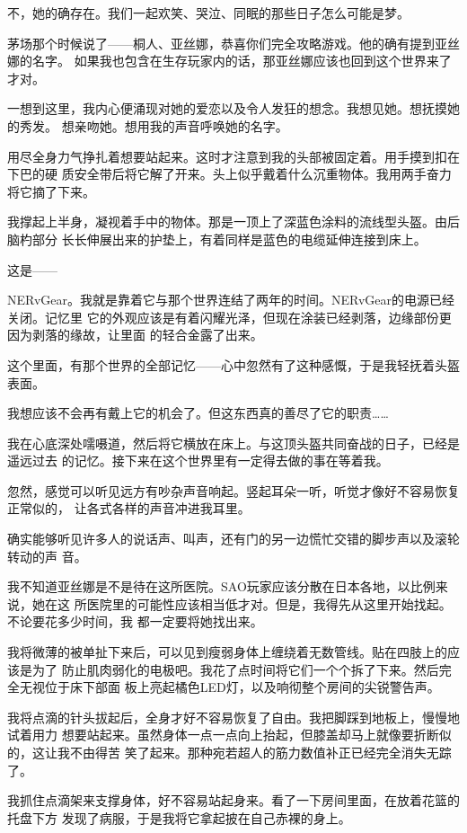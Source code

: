 \documentclass[11pt]{book}
\begin{document}
不，她的确存在。我们一起欢笑、哭泣、同眠的那些日子怎么可能是梦。

茅场那个时候说了——桐人、亚丝娜，恭喜你们完全攻略游戏。他的确有提到亚丝娜的名字。
如果我也包含在生存玩家内的话，那亚丝娜应该也回到这个世界来了才对。

一想到这里，我内心便涌现对她的爱恋以及令人发狂的想念。我想见她。想抚摸她的秀发。
想亲吻她。想用我的声音呼唤她的名字。

用尽全身力气挣扎着想要站起来。这时才注意到我的头部被固定着。用手摸到扣在下巴的硬
质安全带后将它解了开来。头上似乎戴着什么沉重物体。我用两手奋力将它摘了下来。

我撑起上半身，凝视着手中的物体。那是一顶上了深蓝色涂料的流线型头盔。由后脑杓部分
长长伸展出来的护垫上，有着同样是蓝色的电缆延伸连接到床上。

这是——

NERvGear。我就是靠着它与那个世界连结了两年的时间。NERvGear的电源已经关闭。记忆里
它的外观应该是有着闪耀光泽，但现在涂装已经剥落，边缘部份更因为剥落的缘故，让里面
的轻合金露了出来。

这个里面，有那个世界的全部记忆——心中忽然有了这种感慨，于是我轻抚着头盔表面。

我想应该不会再有戴上它的机会了。但这东西真的善尽了它的职责……

我在心底深处嚅嗫道，然后将它横放在床上。与这顶头盔共同奋战的日子，已经是遥远过去
的记忆。接下来在这个世界里有一定得去做的事在等着我。

忽然，感觉可以听见远方有吵杂声音响起。竖起耳朵一听，听觉才像好不容易恢复正常似的，
让各式各样的声音冲进我耳里。

确实能够听见许多人的说话声、叫声，还有门的另一边慌忙交错的脚步声以及滚轮转动的声
音。

我不知道亚丝娜是不是待在这所医院。SAO玩家应该分散在日本各地，以比例来说，她在这
所医院里的可能性应该相当低才对。但是，我得先从这里开始找起。不论要花多少时间，我
都一定要将她找出来。

我将微薄的被单扯下来后，可以见到瘦弱身体上缠绕着无数管线。贴在四肢上的应该是为了
防止肌肉弱化的电极吧。我花了点时间将它们一个个拆了下来。然后完全无视位于床下部面
板上亮起橘色LED灯，以及响彻整个房间的尖锐警告声。

我将点滴的针头拔起后，全身才好不容易恢复了自由。我把脚踩到地板上，慢慢地试着用力
想要站起来。虽然身体一点一点向上抬起，但膝盖却马上就像要折断似的，这让我不由得苦
笑了起来。那种宛若超人的筋力数值补正已经完全消失无踪了。

我抓住点滴架来支撑身体，好不容易站起身来。看了一下房间里面，在放着花篮的托盘下方
发现了病服，于是我将它拿起披在自己赤裸的身上。
\end{document}
